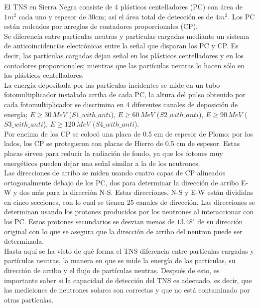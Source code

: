 El TNS en Sierra Negra consiste de 4 plásticos centelladores (PC) con área de $1m^2$ cada uno y espesor de 30cm; así el área total de detección es de $4m^2$. Los PC están rodeados por arreglos de contadores proporcionales (CP).\\

Se diferencía entre partículas neutras y partículas cargadas mediante un sistema de anticoincidencias electrónicas entre la señal que disparan los PC y CP. Es decir, las partículas cargadas dejan señal en los plásticos centelladores y en los contadores proporcionales; mientras que las partículas neutras lo hacen sólo en los plásticos centelladores.\\

La energía depositada por las partículas incidentes se mide en un tubo fotomultiplicador instalado arriba de cada PC, la altura del pulso obtenido por cada fotomultiplicador se discrimina en 4 diferentes canales de deposición de energía; $E\geq 30 \, MeV$ ($S1 \_ with \_ anti$), $E\geq 60 \, MeV$ ($S2 \_ with \_ anti$), $E\geq 90 \, MeV$ ($S3 \_ with \_ anti$), $E\geq 120 \, MeV$ ($S4 \_ with \_ anti$).\\

Por encima de los CP se colocó una placa de 0.5 cm de espesor de Plomo; por los lados, los  CP se protegieron con placas de Hierro de 0.5 cm de espesor. Estas placas sirven para reducir la radiación de fondo, ya que los fotones muy energéticos pueden dejar una señal similar a la de los neutrones. \\

Las direcciones de arribo se miden usando cuatro capas de CP alineados ortogonalmente debajo de los PC, dos para determinar la dirección de arribo E-W y dos más para la dirección N-S. Estas direcciones, N-S y E-W están divididas en cinco secciones, con lo cual se tienen 25 canales de dirección. Las direcciones se determinan usando los protones producidos por los neutrones al interaccionar con los PC. Estos protones secundarios se desvian menos de $13.48^{\circ} $ de su dirección original con lo que se asegura que la dirección de arribo del neutron puede ser determinada\cite{TNS}.\\

Hasta aquí se ha visto de qué forma el TNS diferencia entre partículas cargadas y partículas neutras, la manera en que se mide la energía de las partículas, su dirección de arribo y el flujo de partículas neutras. Después de esto, es importante saber si la capacidad de detección del TNS es adecuado, es decir,  que las mediciones de neutrones solares son correctas y que no está contaminado por otras partículas.\\

